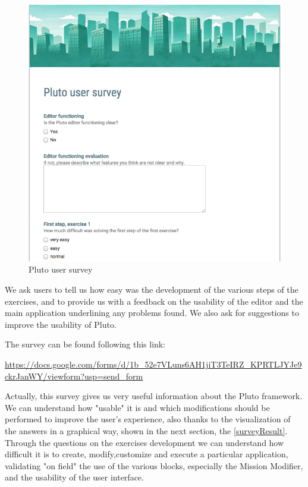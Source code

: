 \begin{figure}[H]
  \centering
  \includegraphics[width=\linewidth]{pictures/survey.png}
  \caption{Pluto user survey}
  \label{fig:survey}
\end{figure}

We ask users to tell us how easy was the development of the various steps of the exercises, and to provide us with a feedback on the usability of the editor and the main application underlining any problems found.
We also ask for suggestions to improve the usability of Pluto.

The survey can be found following this link:

\url{https://docs.google.com/forms/d/1b_52e7VLuns6AH1jiT3TeIRZ_KPRTLJYJe9ckrJanWY/viewform?usp=send_form}


Actually, this survey gives us very useful information about the Pluto framework. We can understand how "usable" it is and which modifications should be performed to improve the user's experience, also thanks to the visualization of the answers in a graphical way, shown in the next section, the \ref{surveyResult}.
Through the questions on the exercises development we can understand how difficult it is to create, modify,customize and execute a particular application, validating "on field" the use of the various blocks, especially the Mission Modifier, and the usability of the user interface.

